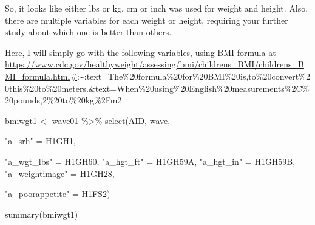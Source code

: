 \documentclass[
]{book}
\newenvironment{Shaded}{\begin{snugshade}}{\end{snugshade}}
\newcommand{\FunctionTok}[1]{\textcolor[rgb]{0.00,0.00,0.00}{#1}}
\newcommand{\NormalTok}[1]{#1}
\newcommand{\OtherTok}[1]{\textcolor[rgb]{0.56,0.35,0.01}{#1}}
\newcommand{\SpecialCharTok}[1]{\textcolor[rgb]{0.00,0.00,0.00}{#1}}
\newcommand{\StringTok}[1]{\textcolor[rgb]{0.31,0.60,0.02}{#1}}
\begin{document}
So, it looks like either lbs or kg, cm or inch was used for weight and height. Also, there are multiple variables for each weight or height, requiring your further study about which one is better than others.

Here, I will simply go with the following variables, using BMI formula at \url{https://www.cdc.gov/healthyweight/assessing/bmi/childrens_BMI/childrens_BMI_formula.html\#}:\textasciitilde:text=The\%20formula\%20for\%20BMI\%20is,to\%20convert\%20this\%20to\%20meters.\&text=When\%20using\%20English\%20measurements\%2C\%20pounds,2\%20to\%20kg\%2Fm2.

\begin{Shaded}
\begin{Highlighting}[]
\NormalTok{bmiwgt1 }\OtherTok{\textless{}{-}}\NormalTok{ wave01 }\SpecialCharTok{\%\textgreater{}\%}
  \FunctionTok{select}\NormalTok{(AID,}
\NormalTok{         wave,}
         
         \StringTok{"a\_srh"} \OtherTok{=}\NormalTok{ H1GH1,}
         
         \StringTok{"a\_wgt\_lbs"} \OtherTok{=}\NormalTok{ H1GH60,}
         \StringTok{"a\_hgt\_ft"} \OtherTok{=}\NormalTok{ H1GH59A,}
         \StringTok{"a\_hgt\_in"} \OtherTok{=}\NormalTok{ H1GH59B,}
         \StringTok{"a\_weightimage"} \OtherTok{=}\NormalTok{ H1GH28,}
         
         \StringTok{"a\_poorappetite"} \OtherTok{=}\NormalTok{ H1FS2)}

\FunctionTok{summary}\NormalTok{(bmiwgt1)}
\end{Highlighting}
\end{Shaded}
\end{document}
